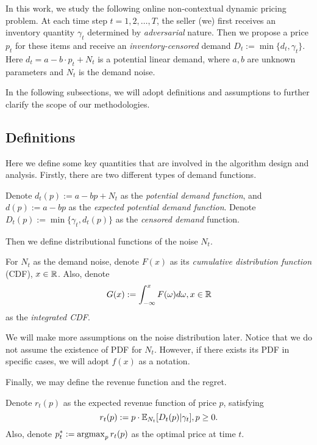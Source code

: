 In this work, we study the following online non-contextual dynamic pricing problem. At each time step $t=1,2,\ldots, T$, the seller (we) first receives an inventory quantity $\gamma_t$ determined by \emph{adversarial} nature. Then we propose a price $p_t$ for these items and receive an \emph{inventory-censored} demand $D_t := \min\{d_t, \gamma_t\}$. Here $d_t=a-b\cdot p_t + N_t$ is a potential linear demand, where $a, b$ are unknown parameters and $N_t$ is the demand noise.

In the following subsections, we will adopt definitions and assumptions to further clarify the scope of our methodologies.

\subsection{Definitions}
\label{subsec:definitions}
Here we define some key quantities that are involved in the algorithm design and analysis. Firstly, there are two different types of demand functions.

\begin{definition}
    \label{def:demand}
    Denote $d_t(p):=a-bp+N_t$ as the \emph{potential demand function}, and $d(p):=a-bp$ as the \emph{expected potential demand function}. Denote $D_t(p):=\min\{\gamma_t, d_t(p)\}$ as the \emph{censored demand} function.
\end{definition}

Then we define distributional functions of the noise $N_t$.
\begin{definition}
    \label{def:cdf_pdf}
    For $N_t$ as the demand noise, denote $F(x)$ as its \emph{cumulative distribution function} (CDF), $x\in\mathbb{R}$. Also, denote
    \begin{equation}
        \label{equ:gdf}
        G(x):=\int_{-\infty}^x F(\omega)d\omega, x\in\mathbb{R}
    \end{equation}
    as the \emph{integrated CDF}.
\end{definition}

We will make more assumptions on the noise distribution later. Notice that we do not assume the existence of PDF for $N_t$. However, if there exists its PDF in specific cases, we will adopt $f(x)$ as a notation.

Finally, we may define the revenue function and the regret.

\begin{definition}
    \label{def:revenue}
    Denote $r_t(p)$ as the expected revenue function of price $p$, satisfying
    \begin{equation}
        \label{equ:revenue_function}
        r_t(p) := p\cdot\mathbb{E}_{N_t}[D_t(p)|\gamma_t], p\geq 0.
    \end{equation}
    Also, denote $p_t^*:=\mathop{\mathrm{argmax}}_{p}r_t(p)$ as the optimal price at time $t$.
\end{definition}

